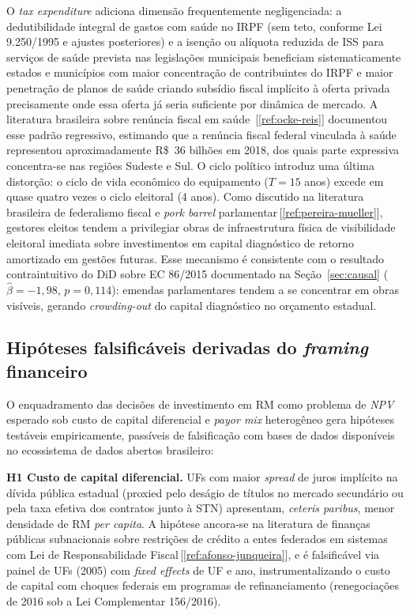 \documentclass[12pt,a4paper,oneside]{article}
\begin{document}
O \textit{tax expenditure} adiciona dimensão frequentemente
negligenciada: a dedutibilidade integral de gastos com saúde no
IRPF (sem teto, conforme Lei 9.250/1995 e ajustes posteriores) e
a isenção ou alíquota reduzida de ISS para serviços de saúde
prevista nas legislações municipais beneficiam sistematicamente
estados e municípios com maior concentração de contribuintes do
IRPF e maior penetração de planos de saúde \textemdash{} criando
subsídio fiscal implícito à oferta privada precisamente onde
essa oferta já seria suficiente por dinâmica de mercado. A
literatura brasileira sobre renúncia fiscal em saúde
\,[\ref{ref:ocke-reis}] documentou esse padrão regressivo,
estimando que a renúncia fiscal federal vinculada à saúde
representou aproximadamente R\$~36 bilhões em 2018, dos quais
parte expressiva concentra-se nas regiões Sudeste e Sul. O
ciclo político introduz uma última distorção: o ciclo de vida
econômico do equipamento ($T = 15$ anos) excede em quase quatro
vezes o ciclo eleitoral (4 anos). Como discutido na literatura
brasileira de federalismo fiscal e \textit{pork barrel}
parlamentar\,[\ref{ref:pereira-mueller}], gestores eleitos
tendem a privilegiar obras de infraestrutura física de
visibilidade eleitoral imediata sobre investimentos em capital
diagnóstico de retorno amortizado em gestões futuras. Esse
mecanismo é consistente com o resultado contraintuitivo do DiD
sobre EC 86/2015 documentado na Seção~\ref{sec:causal}
($\hat\beta = -1{,}98$, $p = 0{,}114$): emendas parlamentares
tendem a se concentrar em obras visíveis, gerando
\textit{crowding-out} do capital diagnóstico no orçamento
estadual.

\subsection{Hipóteses falsificáveis derivadas do
\textit{framing} financeiro}\label{subsec:hipoteses-financeiras}

O enquadramento das decisões de investimento em RM como problema
de \textit{NPV} esperado sob custo de capital diferencial e
\textit{payor mix} heterogêneo gera hipóteses testáveis
empiricamente, passíveis de falsificação com bases de dados
disponíveis no ecossistema de dados abertos brasileiro:

\textbf{H1 \textemdash{} Custo de capital diferencial.} UFs com
maior \textit{spread} de juros implícito na dívida pública estadual
(proxied pelo deságio de títulos no mercado secundário ou pela
taxa efetiva dos contratos junto à STN) apresentam, \textit{ceteris
paribus}, menor densidade de RM \textit{per capita}. A hipótese
ancora-se na literatura de finanças públicas subnacionais sobre
restrições de crédito a entes federados em sistemas com Lei de
Responsabilidade Fiscal\,[\ref{ref:afonso-junqueira}], e é
falsificável via painel de UFs (2005) com
\textit{fixed effects} de UF e ano, instrumentalizando o custo de
capital com choques federais em programas de refinanciamento
(renegociações de 2016 sob a Lei Complementar
156/2016).
\end{document}
